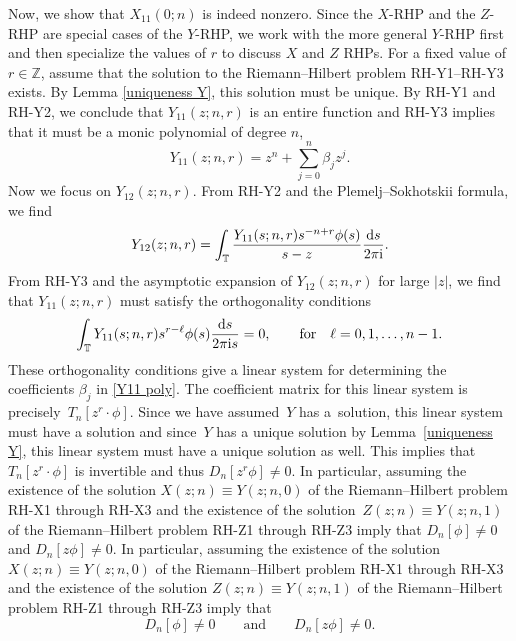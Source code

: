 \documentclass[10pt,a4paper]{amsart}
\numberwithin{equation}{section}
\newcommand{\Z}{{\mathbb Z}}
\newcommand{\T}{{\mathbb T}}
\newcommand{\be}{\beta}
\newcommand{\ii}{{\rm i}}
\newcommand{\dd}{{\rm d}}
\newcommand{\qandq}{\qquad \text{and} \qquad}
\begin{document}
	Now, we show that $X_{11}(0;n)$ is indeed nonzero. Since the $X$-RHP and the $Z$-RHP are special cases of the $Y$-RHP, we work with the more general $Y$-RHP first and then specialize the values of $r$ to discuss $X$ and $Z$ RHPs. For a fixed value of $r \in \Z$, assume that the solution to the Riemann--Hilbert problem {\rm RH-Y1}--{\rm RH-Y3} exists. By Lemma \ref{uniqueness Y}, this solution must be unique. By {\rm RH-Y1} and {\rm RH-Y2}, we conclude that $Y_{11}(z;n,r)$ is an entire function and {\rm RH-Y3} implies that it must be a monic polynomial of degree $n$,
	\begin{equation}\label{Y11 poly}
		Y_{11}(z;n,r) = z^n + \sum_{j=0}^{n} \be_j z^j.
	\end{equation}
Now we focus on $Y_{12}(z;n,r)$. From {\rm RH-Y2} and the Plemelj--Sokhotskii formula, we find
	\begin{equation}\label{Y12}
		Y_{12}(z;n,r) = \int_{\T} \frac{Y_{11}(s;n,r)s^{-n+r}\phi(s)}{s-z} \frac{\dd s}{2 \pi \ii}.
	\end{equation}
	From {\rm RH-Y3} and the asymptotic expansion of $Y_{12}(z;n,r)$ for large $|z|$, we find that $Y_{11}(z;n,r)$ must satisfy the orthogonality conditions
	\begin{equation}\label{ort conds}
		\int_{\T} Y_{11}(s;n,r)s^{r-\ell}\phi(s) \frac{\dd s}{2 \pi \ii s} = 0, \qquad \mbox{for} \quad \ell = 0,1, \dots, n-1.
	\end{equation}
	These orthogonality conditions give a linear system for determining the coefficients $\be_j$ in \eqref{Y11 poly}. The coefficient matrix for this linear system is precisely~${T_n[z^r\cdot \phi]}$. Since we have assumed~$Y$ has a~solution, this linear system must have a solution and since~$Y$ has a unique solution by Lemma~\ref{uniqueness Y}, this linear system must have a unique solution as well. This implies that~${T_n[z^r\cdot \phi]}$ is invertible and thus $D_{n}[z^r\phi] \neq 0$.
	In particular, assuming the existence of the solution ${X(z;n) \equiv Y(z;n,0)}$ of the Riemann--Hilbert problem {\rm RH-X1} through {\rm RH-X3} and the existence of the solution~${Z(z;n) \equiv Y(z;n,1)}$ of the Riemann--Hilbert problem {\rm RH-Z1} through {\rm RH-Z3} imply that $D_n[\phi] \neq 0$ and $D_n[z\phi] \neq 0$.
In particular, assuming the existence of the solution $X(z;n) \equiv Y(z;n,0)$ of the Riemann--Hilbert problem {\rm RH-X1} through {\rm RH-X3} and the existence of the solution $Z(z;n) \equiv Y(z;n,1)$ of the Riemann--Hilbert problem {\rm RH-Z1} through {\rm RH-Z3} imply that
	\begin{equation}\label{nonzero dets}
		D_{n}[\phi] \neq 0 \qandq D_n[z\phi] \neq 0.
	\end{equation}
\end{document}
